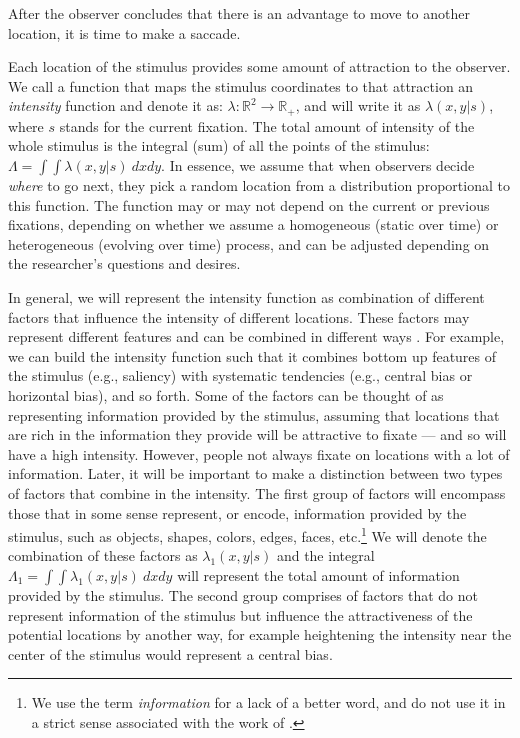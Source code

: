\documentclass{article}
\begin{document}
After the observer concludes that there is an advantage to move to another location, it is time to make a saccade.

Each location of the stimulus provides some amount of attraction to the observer. We call a function that maps the stimulus coordinates to that attraction an \textit{intensity} function and denote it as: $\lambda: \mathbb{R}^2 \rightarrow \mathbb{R}_+$, and will write it as $\lambda(x, y | s)$, where $s$ stands for the current fixation. The total amount of intensity of the whole stimulus is the integral (sum) of all the points of the stimulus: $\Lambda = \int\int \lambda(x, y | s)~dx dy$. In essence, we assume that when observers decide \textit{where} to go next, they pick a random location from a distribution proportional to this function. The function may or may not depend on the current or previous fixations, depending on whether we assume a homogeneous (static over time) or heterogeneous (evolving over time) process, and can be adjusted depending on the researcher's questions and desires.

In general, we will represent the intensity function as combination of different factors that influence the intensity of different locations. These factors may represent different features and can be combined in different ways \citep[see][]{barthelme2013spatial}. For example, we can build the intensity function such that it combines bottom up features of the stimulus (e.g., saliency) with systematic tendencies (e.g., central bias or horizontal bias), and so forth. Some of the factors can be thought of as representing information provided by the stimulus, assuming that locations that are rich in the information they provide will be attractive to fixate --- and so will have a high intensity. However, people not always fixate on locations with a lot of information. Later, it will be important to make a distinction between two types of factors that combine in the intensity. The first group of factors will encompass those that in some sense represent, or encode, information provided by the stimulus, such as objects, shapes, colors, edges, faces, etc.\footnote{We use the term \textit{information} for a lack of a better word, and do not use it in a strict sense associated with the work of \citet{shannon1948communication}.} We will denote the combination of these factors as $\lambda_1(x, y |s)$ and the integral $\Lambda_1 = \int\int \lambda_1(x, y | s)~dx dy$ will represent the total amount of information provided by the stimulus. The second group comprises of factors that do not represent information of the stimulus but influence the attractiveness of the potential locations by another way, for example heightening the intensity near the center of the stimulus would represent a central bias.
\end{document}
